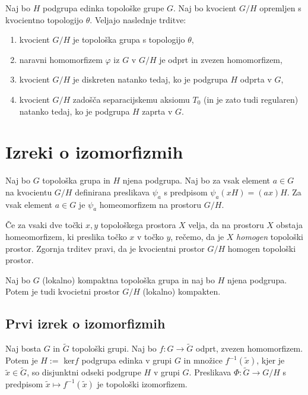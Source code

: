\documentclass[mat1]{fmfdelo}
\begin{document}
\begin{izrek}\label{izr:kvocpovzetek}
Naj bo $H$ podgrupa edinka topološke grupe $G$. Naj bo kvocient $G/H$ opremljen s kvocientno topologijo $\theta$. Veljajo naslednje trditve:
\begin{enumerate}
\item kvocient $G/H$ je topološka grupa s topologijo $\theta$,
\item naravni homomorfizem $\varphi$ iz $G$ v $G/H$ je odprt in zvezen homomorfizem,
\item kvocient $G/H$ je diskreten natanko tedaj, ko je podgrupa $H$ odprta v $G$,
\item kvocient $G/H$ zadošča separacijskemu aksiomu $T_0$ (in je zato tudi regularen) natanko tedaj, ko je podgrupa $H$ zaprta v $G$.
\end{enumerate}
\end{izrek}

\section{Izreki o izomorfizmih}

\begin{trditev}\label{trd:homogenkvoc}
	Naj bo $G$ topološka grupa in $H$ njena podgrupa. Naj bo za vsak element $a \in G$ na kvocientu $G/H$ definirana preslikava $\psi_a$ s predpisom $\psi_a(xH) = (ax)H$.
	Za vsak element $a \in G$ je $\psi_a$ homeomorfizem na prostoru $G/H$.
\end{trditev}

\begin{opomba}\label{opo:homogenkvoc}
	Če za vsaki dve točki $x, y$ topološkega prostora $X$ velja, da na prostoru $X$ obstaja homeomorfizem, ki preslika točko $x$ v točko $y$, rečemo, da je $X$ \emph{homogen} topološki prostor. Zgornja trditev pravi, da je kvocientni prostor $G/H$ homogen topološki prostor.
\end{opomba}

\begin{trditev}\label{trd:kvockompakt}
	Naj bo $G$ (lokalno) kompaktna topološka grupa in naj bo $H$ njena podgrupa. Potem je tudi kvocietni prostor $G/H$ (lokalno) kompakten.
\end{trditev}

\subsection{Prvi izrek o izomorfizmih}
\begin{izrek}\label{izr:prvitopizrek}
Naj bosta $G$ in $\widetilde{G}$ topološki grupi. Naj bo $f: G \to \widetilde{G}$ odprt, zvezen homomorfizem. Potem je $H :=$ ker$f$ podgrupa edinka v grupi $G$ in množice $f^{-1}(\tilde{x})$, kjer je $\tilde{x} \in \widetilde{G}$, so disjunktni odseki podgrupe $H$ v grupi $G$. Preslikava $\Phi:\widetilde{G} \to G/H$ s predpisom $\tilde{x} \mapsto f^{-1}(\tilde{x})$ je topološki izomorfizem.
\end{izrek}
\end{document}
